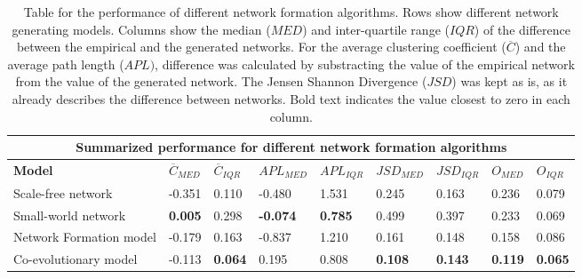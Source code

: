 \documentclass[11pt]{article}
\begin{document}
\begin{table}[H]
\begin{center}
    
\begin{tabular}{ |p{4.2cm}||p{1cm}|p{0.9cm}|p{1.35cm}|p{1.3cm}|p{1.35cm}|p{1.2cm}|p{0.93cm}|p{0.9cm}|}
    \hline
    \multicolumn{9}{|c|}{Summarized performance for different network formation algorithms} \\
    \hline
    \bf{Model} & $\overline{C}_{MED}$ & $\overline{C}_{IQR}$ & $APL_{MED}$ & $APL_{IQR}$ & $JSD_{MED}$ & $JSD_{IQR}$ & $O_{MED}$ & $O_{IQR}$\\
    \hline
    Scale-free network   & -0.351    & 0.110 &   -0.480	 &   1.531 &   0.245 & 0.163 & 0.236 & 0.079\\
    Small-world network &   \bf{0.005}  & 0.298   & \bf{-0.074}	&   \bf{0.785} &   0.499 & 0.397 & 0.233 & 0.069\\
    Network Formation model   &-0.179	 & 0.163	&  -0.837 & 1.210 &   0.161 & 0.148 & 0.158 & 0.086\\
    Co-evolutionary model & -0.113 & \bf{0.064} & 0.195	 & 0.808 & \bf{0.108} & \bf{0.143} & \bf{0.119} & \bf{0.065} \\
    \hline
\end{tabular}
\end{center}
\caption{Table for the performance of different network formation algorithms. Rows show different network generating models. Columns show the median ($MED$) and inter-quartile range ($IQR$) of the difference between the empirical and the generated networks. For the average clustering coefficient ($\overline{C}$) and the average path length ($APL)$, difference was calculated by substracting the value of the empirical network from the value of the generated network. The Jensen Shannon Divergence ($JSD$) was kept as is, as it already describes the difference between networks. Bold text indicates the value closest to zero in each column.}
\label{table:performance}
\end{table}
\end{document}
